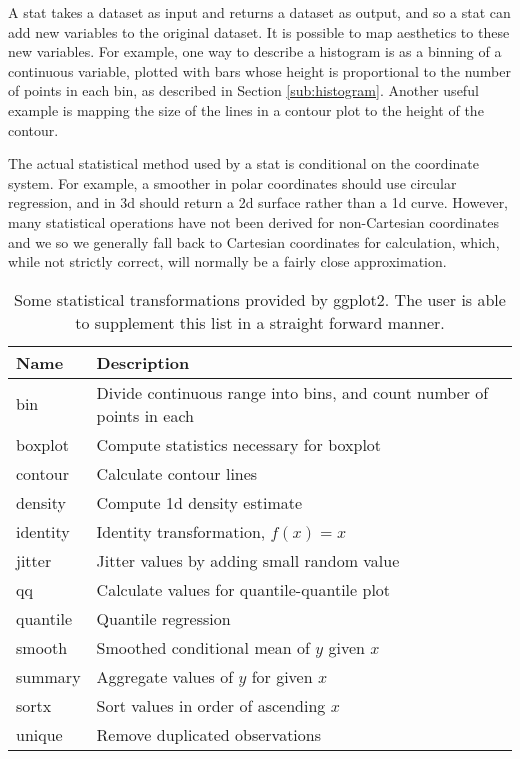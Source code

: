 A stat takes a dataset as input and returns a dataset as output, and so a stat can add new variables to the original dataset.  It is possible to map aesthetics to these new variables.  For example, one way to describe a histogram is as a binning of a continuous variable, plotted with bars whose height is proportional to the number of points in each bin, as described in Section \ref{sub:histogram}.  Another useful example is mapping the size of the lines in a contour plot to the height of the contour.

The actual statistical method used by a stat is conditional on the coordinate system.  For example, a smoother in polar coordinates should use circular regression, and in 3d should return a 2d surface rather than a 1d curve.  However, many statistical operations have not been derived for non-Cartesian coordinates and we so we generally fall back to Cartesian coordinates for calculation, which, while not strictly correct, will normally be a fairly close approximation.  

\begin{table}
	\begin{center}
	\begin{tabular}{l|l}
	Name & Description \\
	\hline
	bin & Divide continuous range into bins, and count number of points in each\\ 
	boxplot & Compute statistics necessary for boxplot\\
	contour & Calculate contour lines\\
	density & Compute 1d density estimate \\
	identity & Identity transformation, $f(x) = x$ \\
	jitter & Jitter values by adding small random value \\
	qq & Calculate values for quantile-quantile plot \\
	quantile & Quantile regression\\
	smooth & Smoothed conditional mean of $y$ given $x$ \\
	summary & Aggregate values of $y$ for given $x$ \\
	sortx & Sort values in order of ascending $x$\\
	unique & Remove duplicated observations\\
	\end{tabular}
	\end{center}
	\caption{Some statistical transformations provided by ggplot2.  The user is able to supplement this list in a straight forward manner.}
	\label{tbl:statistics}
\end{table}

